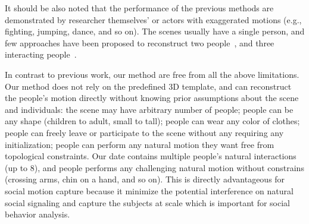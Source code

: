 It should be also noted that the performance of the previous methods are demonstrated by researcher themselves' or actors with exaggerated motions (e.g., fighting, jumping, dance, and so on). The scenes usually have a single person, and few approaches have been proposed to reconstruct two people~\cite{Ye-2012}, and three interacting people~\cite{Liu-2013}. 


In contrast to previous work, our method are free from all the above limitations. Our method does not rely on the predefined 3D template, and can reconstruct the people's motion directly without knowing prior assumptions about the scene and individuals: the scene may have arbitrary number of people; people can be any shape (children to adult, small to tall); people can wear any color of clothes; people can freely leave or participate to the scene without any requiring any initialization; people can perform any natural motion they want free from topological constraints. Our date contains multiple people's natural interactions (up to 8), and people performs any challenging natural motion without constrains (crossing arms, chin on a hand, and so on). This is directly advantageous for social motion capture because it minimize the potential interference on natural social signaling and capture the subjects at scale which is important for social behavior analysis. 






